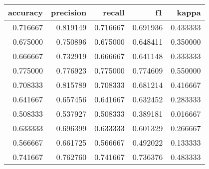 \begin{tabular}{rrrrr}
\toprule
accuracy & precision & recall & f1 & kappa \\
\midrule
0.716667 & 0.819149 & 0.716667 & 0.691936 & 0.433333 \\
0.675000 & 0.750896 & 0.675000 & 0.648411 & 0.350000 \\
0.666667 & 0.732919 & 0.666667 & 0.641148 & 0.333333 \\
0.775000 & 0.776923 & 0.775000 & 0.774609 & 0.550000 \\
0.708333 & 0.815789 & 0.708333 & 0.681214 & 0.416667 \\
0.641667 & 0.657456 & 0.641667 & 0.632452 & 0.283333 \\
0.508333 & 0.537927 & 0.508333 & 0.389181 & 0.016667 \\
0.633333 & 0.696399 & 0.633333 & 0.601329 & 0.266667 \\
0.566667 & 0.661725 & 0.566667 & 0.492022 & 0.133333 \\
0.741667 & 0.762760 & 0.741667 & 0.736376 & 0.483333 \\
\bottomrule
\end{tabular}
